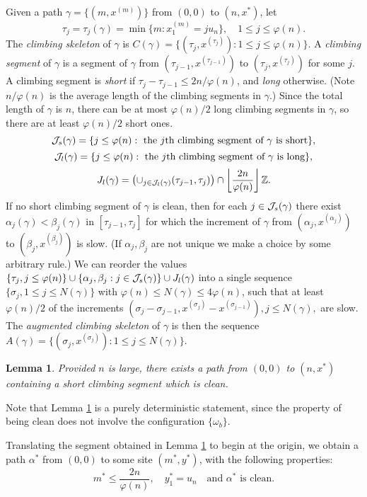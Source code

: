 \documentclass[12pt]{amsart}
\theoremstyle{plain}
\newtheorem{lemma}{Lemma}[section]
\theoremstyle{definition}
\numberwithin{equation}{section}
\begin{document}
Given a path $\gamma = \{(m,x^{(m)})\}$ from $(0,0)$ to $(n,x^*)$, let 
\[
  \tau_j = \tau_j(\gamma) = \min\{m: x_1^{(m)} = ju_n\}, \quad 1 \leq j \leq \varphi(n).
  \]
The \emph{climbing skeleton} of $\gamma$ is $C(\gamma) = \{(\tau_j,x^{(\tau_j)}): 1 \leq j \leq \varphi(n)\}$.
A \emph{climbing segment} of $\gamma$ is a segment of $\gamma$ from $(\tau_{j-1},x^{(\tau_{j-1})})$ to $(\tau_j,x^{(\tau_j)})$ for some $j$.  A climbing segment is \emph{short} if $\tau_j - \tau_{j-1} \leq 2n/\varphi(n)$, and \emph{long} otherwise.  (Note $n/\varphi(n)$ is the average length of the climbing segments in $\gamma$.)  Since the total length of $\gamma$ is $n$, there can be at most $\varphi(n)/2$ long climbing segments in $\gamma$, so there are at least $\varphi(n)/2$ short ones.  
\[
  \mathcal{J}_s(\gamma) = \{j \leq \varphi(n): \text{ the $j$th climbing segment of $\gamma$ is short} \},
  \]
\[
  \mathcal{J}_l(\gamma) = \{j \leq \varphi(n): \text{ the $j$th climbing segment of $\gamma$ is long} \},
  \]
\[
  J_l(\gamma) = \left( \cup_{j \in \mathcal{J}_l(\gamma)} (\tau_{j-1},\tau_j) \right) \cap \left\lfloor \frac{2n}{\varphi(n)} \right\rfloor \mathbb{Z}.
  \]
If no short climbing segment of $\gamma$ is clean, then for each $j \in \mathcal{J}_s(\gamma)$ there exist $\alpha_j(\gamma)<\beta_j(\gamma)$ in $[\tau_{j-1},\tau_j]$ for which the increment of $\gamma$ from $(\alpha_j,x^{(\alpha_j)})$ to $(\beta_j,x^{(\beta_j)})$ is slow.  (If $\alpha_j,\beta_j$ are not unique we make a choice by some arbitrary rule.)  
We can reorder the values $\{\tau_j, j \leq \varphi(n)\} \cup \{\alpha_j,\beta_j: j \in \mathcal{J}_s(\gamma)\} \cup J_l(\gamma)$ into a single sequence $\{\sigma_j, 1 \leq j \leq N(\gamma)\}$ with $\varphi(n) \leq N(\gamma) \leq 4\varphi(n)$, such that at least $\varphi(n)/2$ of the increments $(\sigma_j - \sigma_{j-1},x^{(\sigma_j)} - x^{(\sigma_{j-1})}), j \leq N(\gamma),$ are slow.  The \emph{augmented climbing skeleton} of $\gamma$ is then the sequence 
$A(\gamma) = \{(\sigma_j,x^{(\sigma_j)}): 1 \leq j \leq N(\gamma)\}$.

\begin{lemma} \label{existence}
Provided $n$ is large, there exists a path from $(0,0)$ to $(n,x^*)$ containing a short climbing segment which is clean.
\end{lemma}

Note that Lemma \ref{existence} is a purely deterministic statement, since the property of being clean does not involve the configuration $\{\omega_b\}$.  

Translating the segment obtained in Lemma \ref{existence} to begin at the origin, we obtain a path $\alpha^*$ from $(0,0)$ to some site $(m^*,y^*)$, with the following properties:
\begin{equation} \label{properties}
  m^* \leq \frac{2n}{\varphi(n)}, \quad y_1^* = u_n \quad \text{and $\alpha^*$ is clean}.
  \end{equation}
  
\end{document}
